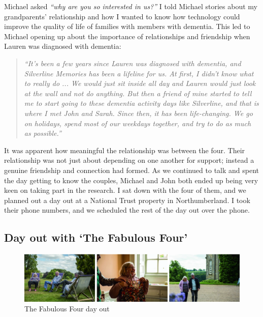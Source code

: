 Michael asked \textit{``why are you so interested in us?''} I told Michael stories about my grandparents' relationship and how I wanted to know how technology could improve the quality of life of families with members with dementia. This led to Michael  opening up about the importance of relationships and friendship when Lauren was diagnosed with dementia:

\begin{quote}
\textit{``It's been a few years since Lauren was diagnosed with dementia, and Silverline Memories has been a lifeline for us. At first, I didn't know what to really do ... We would just sit inside all day and Lauren would just look at the wall and not do anything. But then a friend of mine started to tell me to start going to these dementia activity days like Silverline, and that is where I met John and Sarah. Since then, it has been life-changing. We go on holidays, spend most of our weekdays together, and try to do as much as possible.''
}    
\end{quote}

It was apparent how meaningful the relationship was between the four. Their relationship was not just about depending on one another for support; instead a genuine friendship and connection had formed. As we continued to talk and spent the day getting to know the couples, Michael and John both ended up being very keen on taking part in the research. I sat down with the four of them, and we planned out a day out at a National Trust property in Northumberland. I took their phone numbers, and we scheduled the rest of the day out over the phone.

\subsection{Day out with `The Fabulous Four'}
\label{DayOutOne}

\begin{figure}[htp]
\centering
\includegraphics[width=1\linewidth]{Images/ChapterFour/FamilyDayOut.png}
\caption{The Fabulous Four day out}
\label{fig:DayOut}
\end{figure}

